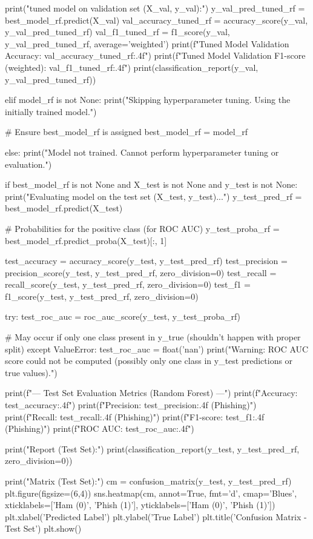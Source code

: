 \begin{ffcode}
    print("\nEvaluating tuned model on validation set (X_val, y_val):")
    y_val_pred_tuned_rf = best_model_rf.predict(X_val)
    val_accuracy_tuned_rf = accuracy_score(y_val, y_val_pred_tuned_rf)
    val_f1_tuned_rf = f1_score(y_val, y_val_pred_tuned_rf, average='weighted')
    print(f"Tuned Model Validation Accuracy: {val_accuracy_tuned_rf:.4f}")
    print(f"Tuned Model Validation F1-score (weighted): {val_f1_tuned_rf:.4f}")
    print(classification_report(y_val, y_val_pred_tuned_rf))

elif model_rf is not None:
    print("Skipping hyperparameter tuning. Using the initially trained model.")

    # Ensure best_model_rf is assigned
    best_model_rf = model_rf

else:
    print("Model not trained. Cannot perform hyperparameter tuning or evaluation.")

if best_model_rf is not None and X_test is not None and y_test is not None:
    print("Evaluating model on the test set (X_test, y_test)...")
    y_test_pred_rf = best_model_rf.predict(X_test)

    # Probabilities for the positive class (for ROC AUC)
    y_test_proba_rf = best_model_rf.predict_proba(X_test)[:, 1]

    test_accuracy = accuracy_score(y_test, y_test_pred_rf)
    test_precision = precision_score(y_test, y_test_pred_rf, zero_division=0)
    test_recall = recall_score(y_test, y_test_pred_rf, zero_division=0)
    test_f1 = f1_score(y_test, y_test_pred_rf, zero_division=0)

    try:
        test_roc_auc = roc_auc_score(y_test, y_test_proba_rf)

    # May occur if only one class present in y_true (shouldn't happen with proper split)
    except ValueError:
        test_roc_auc = float('nan')
        print("Warning: ROC AUC score could not be computed (possibly only one class in y_test predictions or true values).")


    print(f"\n--- Test Set Evaluation Metrics (Random Forest) ---")
    print(f"Accuracy:  {test_accuracy:.4f}")
    print(f"Precision: {test_precision:.4f} (Phishing)")
    print(f"Recall:    {test_recall:.4f} (Phishing)")
    print(f"F1-score:  {test_f1:.4f} (Phishing)")
    print(f"ROC AUC:   {test_roc_auc:.4f}")

    print("\nClassification Report (Test Set):")
    print(classification_report(y_test, y_test_pred_rf, zero_division=0))

    print("\nConfusion Matrix (Test Set):")
    cm = confusion_matrix(y_test, y_test_pred_rf)
    plt.figure(figsize=(6,4))
    sns.heatmap(cm, annot=True, fmt='d', cmap='Blues', xticklabels=['Ham (0)', 'Phish (1)'], yticklabels=['Ham (0)', 'Phish (1)'])
    plt.xlabel('Predicted Label')
    plt.ylabel('True Label')
    plt.title('Confusion Matrix - Test Set')
    plt.show()


\end{ffcode}
